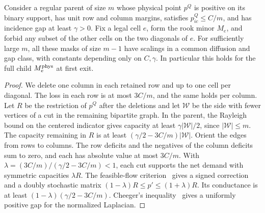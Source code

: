 \begin{lema}\label{lem:hijo-fisico}
Consider a regular parent of size \(m\) whose physical point \(p^{Q}\) is positive on its binary support,
has unit row and column margins, satisfies \(p^{Q}_{ic}\le C/m\), and has incidence gap at least
\(\gamma>0\). Fix a legal cell \(e\), form the rook minor \(M_e\), and forbid any subset of the other
cells on the two diagonals of \(e\). For sufficiently large \(m\), all these masks of size \(m-1\) have
scalings in a common diffusion and gap class, with constants depending only on \(C,\gamma\). In
particular this holds for the full child \(M_e^{\rm phys}\) at first exit.
\end{lema}
\begin{proof}
We delete one column in each retained row and up to one cell per diagonal. The loss in each row is at
most \(3C/m\), and the same holds per column. Let \(R\) be the restriction of \(p^Q\) after the deletions
and let \(\mathcal W\) be the side with fewer vertices of a cut in the remaining bipartite graph. In the
parent, the Rayleigh bound on the centered indicator gives capacity at least \(\gamma |\mathcal W|/2\),
since \(|\mathcal W|\le m\). The capacity remaining in \(R\) is at least \((\gamma/2-3C/m)|\mathcal W|\).
Orient the edges from rows to columns. The row deficits and the negatives of the column deficits sum to
zero, and each has absolute value at most \(3C/m\). With \(\lambda=(3C/m)/(\gamma/2-3C/m)<1\), each cut
supports the net demand with symmetric capacities \(\lambda R\). The feasible-flow criterion~\cite{gale}
gives a signed correction and a doubly stochastic matrix \((1-\lambda)R\le p'\le(1+\lambda)R\). Its
conductance is at
least \((1-\lambda)(\gamma/2-3C/m)\). Cheeger's inequality~\cite{lsok} gives a uniformly positive gap for
the
normalized Laplacian.


\end{proof}
